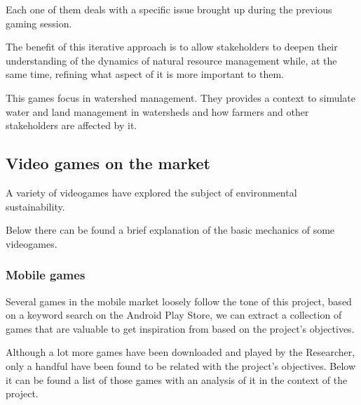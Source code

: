 Each one of them deals with a specific issue
brought up during the previous gaming session.

The benefit of this iterative approach is
to allow stakeholders to deepen their understanding of the dynamics of natural
resource management while, at the same time, refining what aspect of it is more
important to them.

This games focus in watershed management. They provides a context to simulate
water and land management in watersheds and how farmers and other stakeholders
are affected by it.


\subsection{Video games on the market}

A variety of videogames have explored the subject of environmental sustainability.

Below there can be found a brief explanation of the basic mechanics of
some videogames.

\subsubsection{Mobile games}

Several games in the mobile market loosely follow the tone of this project, based on a keyword search on the Android Play Store, we can extract a collection of games that are valuable to get inspiration from based on the project's objectives.

Although a lot more games have been downloaded and played by the Researcher, only a handful have been found to be related with the project's objectives. Below it can be found a list of those games with an analysis of it in the context of the project.


